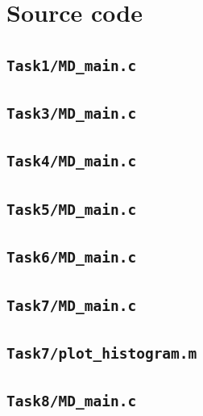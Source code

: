 \vfill



\newpage
\appendix
\section{Source code}

\subsection{\texttt{Task1/MD\_main.c}}


\subsection{\texttt{Task3/MD\_main.c}}


\subsection{\texttt{Task4/MD\_main.c}}


\subsection{\texttt{Task5/MD\_main.c}}


\subsection{\texttt{Task6/MD\_main.c}}


\subsection{\texttt{Task7/MD\_main.c}}

\subsection{\texttt{Task7/plot\_histogram.m}}


\subsection{\texttt{Task8/MD\_main.c}}

